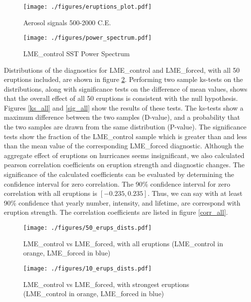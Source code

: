\begin{figure}[!tbp]
\centering
\begin{minipage}[b]{0.45\textwidth}
\texttt{[image: ./figures/eruptions\_plot.pdf]}
\caption{Aerosol signals 500-2000 C.E.}
\label{erups_plot}
\end{minipage}
\hfill
\begin{minipage}[b]{0.45\textwidth}
\texttt{[image: ./figures/power\_spectrum.pdf]}
\caption{LME_{control} SST Power Spectrum}
\label{spectrum}
\end{minipage}
\end{figure}


Distributions of the diagnostics for LME_{control} and LME_{forced}, with all 50 eruptions included, are shown in figure \ref{50_erups}. Performing two sample ks-tests on the distributions, along with significance tests on the difference of mean values, shows that the overall effect of all 50 eruptions is consistent with the null hypothesis. Figures \ref{ks_all} and \ref{sig_all} show the results of these tests. The ks-tests show a maximum difference between the two samples (D-value), and a probability that the two samples are drawn from the same distribution (P-value). The significance tests show the fraction of the LME_{control} sample which is greater than and less than the mean value of the corresponding LME_{forced} diagnostic. Although the aggregate effect of eruptions on hurricanes seems insignificant, we also calculated pearson correlation coefficients on eruption strength and diagnostic changes. The significance of the calculated coefficients can be evaluated by determining the confidence interval for zero correlation. The 90\% confidence interval for zero correlation with all eruptions is $[-0.235,0.235]$. Thus, we can say with at least 90\% confidence that yearly number, intensity, and lifetime, are correspond with eruption strength. The correlation coefficients are listed in figure \ref{corr_all}.   

\begin{figure}[!tbp]
\centering
\texttt{[image: ./figures/50\_erups\_dists.pdf]}
\caption{LME_{control} vs LME_{forced}, with all eruptions (LME_{control} in orange, LME_{forced} in blue)}
\label{50_erups}
\end{figure}

\begin{figure}[!tbp]
\centering
\texttt{[image: ./figures/10\_erups\_dists.pdf]}
\caption{LME_{control} vs LME_{forced}, with strongest eruptions (LME_{control} in orange, LME_{forced} in blue)}
\label{10_erups}
\end{figure}


